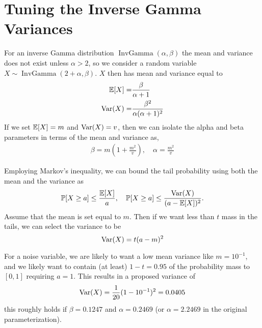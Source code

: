 \documentclass{article}
\begin{document}
\section{Tuning the Inverse Gamma Variances}
\label{sec:invgamma}
For an inverse Gamma distribution $\operatorname{InvGamma}(\alpha,\beta)$ the mean and variance does not exist unless $\alpha>2$, so we consider a random variable $X\sim\operatorname{InvGamma}(2+\alpha,\beta)$. $X$ then has mean and variance equal to 
\begin{align}
\operatorname{\mathbb{E}}\!{\left[X\right]}=&\frac{\beta}{\alpha+1}\\
\operatorname{\mathrm{Var}}\!{\left(X\right)}=&\frac{\beta^2}{\alpha(\alpha+1)^2}
\end{align}
If we set $\operatorname{\mathbb{E}}\!{\left[X\right]}=m$ and $\operatorname{\mathrm{Var}}\!{\left(X\right)}=v$, then we can isolate the alpha and beta parameters in terms of the mean and variance as,
\begin{align}
\beta=m\left(1+\frac{m^2}{v}\right),\quad 
\alpha=\frac{m^2}{v}
\end{align}



Employing Markov's inequality, we can bound the tail probability using both the mean and the variance as 
\begin{equation}
\mathbb{P}[X\geq a]\leq \frac{\operatorname{\mathbb{E}}\!{\left[X\right]}}{a},\quad \mathbb{P}[X\geq a]\leq \frac{\operatorname{\mathrm{Var}}\!{\left(X\right)}}{(a-\operatorname{\mathbb{E}}\!{\left[X\right]})^2}.
\end{equation}
Assume that the mean is set equal to $m$. Then if we want less than $t$ mass in the tails, we can select the variance to be
\begin{equation}
\operatorname{\mathrm{Var}}\!{\left(X\right)}=t(a-m)^2
\end{equation}

For a noise variable, we are likely to want a low mean variance like $m=10^{-1}$, and we likely want to contain (at least) $1-t=0.95$ of the probability mass to $[0,1]$ requiring $a=1$. This results in a proposed variance of 
\begin{equation}
\operatorname{\mathrm{Var}}\!{\left(X\right)}=\frac{1}{20}(1-10^{-1})^2=0.0405
\end{equation} 
this roughly holds if $\beta=0.1247$ and $\alpha=0.2469$ (or $\alpha=2.2469$ in the original parameterization).
\end{document}

